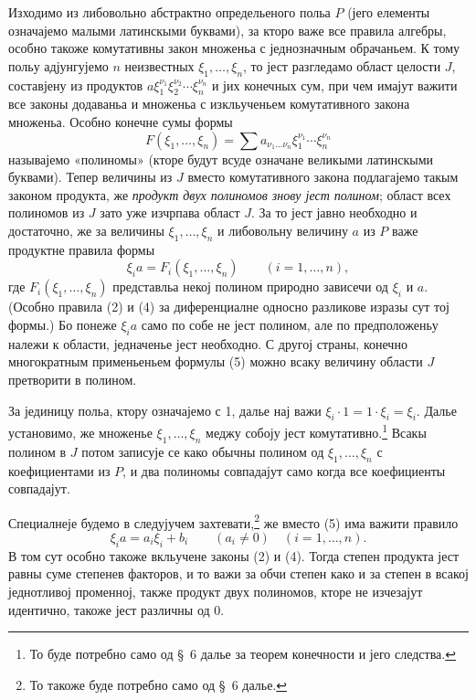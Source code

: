 ﻿\documentclass[11pt]{article}
\begin{document}
Изходимо из либовольно абстрактно определьеного польа \(P\) (јего елементы означајемо малыми латинскыми буквами), за кторо важе все правила алгебры, особно такоже комутативны закон множеньа с једнозначным обрачаньем. К тому польу адјунгујемо \(n\) неизвестных \(\xi_1,\ldots,\xi_n\), то јест разгледамо област целости \(J\), составјену из продуктов \(a\xi_1^{\nu_1}\xi_2^{\nu_2}\cdots\xi_n^{\nu_n}\) и јих конечных сум, при чем имајут важити все законы додаваньа и множеньа с изкльученьем комутативного закона множеньа. Особно конечне сумы формы
\[
 F(\xi_1,\ldots,\xi_n)=\sum a_{\nu_1\ldots\nu_n}\xi_1^{\nu_1}\cdots\xi_n^{\nu_n}
\]
называјемо «полиномы» (кторе будут всуде означане великыми латинскыми буквами). Тепер величины из \(J\) вместо комутативного закона подлагајемо такым законом продукта, же \textit{продукт двух полиномов знову јест полином}; област всех полиномов из \(J\) зато уже изчрпава област \(J\). За то јест јавно необходно и достаточно, же за величины \(\xi_1,\ldots,\xi_n\) и либовольну величину \(a\) из \(P\) важе продуктне правила формы
\begin{equation}
 \xi_i a=F_i(\xi_1,\ldots,\xi_n)\qquad (i=1,\ldots,n),
\tag{5}
\end{equation}
где \(F_i(\xi_1,\ldots,\xi_n)\) представльа некој полином природно зависечи од \(\xi_i\) и \(a\). (Особно правила (2) и (4) за диференциалне односно разликове изразы сут тој формы.) Бо понеже \(\xi_i a\) само по собе не јест полином, але по предположеньу належи к области, једначенье јест необходно. С другој страны, конечно многократным применьеньем формулы (5) можно всаку величину области \(J\) претворити в полином.

За јединицу польа, ктору означајемо с 1, далье нај важи \(\xi_i\cdot1=1\cdot\xi_i=\xi_i\). Далье установимо, же множенье \(\xi_1,\ldots,\xi_n\) меджу собоју јест комутативно.\footnote{То буде потребно само од \S~6 далье за теорем конечности и јего следства.} Всакы полином в \(J\) потом записује се како обычны полином од \(\xi_1,\ldots,\xi_n\) с коефициентами из \(P\), и два полиномы совпадајут само когда все коефициенты совпадајут.

Специалнеје будемо в следујучем захтевати,\footnote{То такоже буде потребно само од \S~6 далье.} же вместо (5) има важити правило
\begin{equation}
 \xi_i a=a_i\xi_i+b_i\qquad (a_i\ne0)\quad(i=1,\ldots,n).
\tag{6}
\end{equation}
В том сут особно такоже вкльучене законы (2) и (4). Тогда степен продукта јест равны суме степенев факторов, и то важи за обчи степен како и за степен в всакој једнотливој променној, также продукт двух полиномов, кторе не изчезајут идентично, такоже јест различны од 0.
\end{document}
